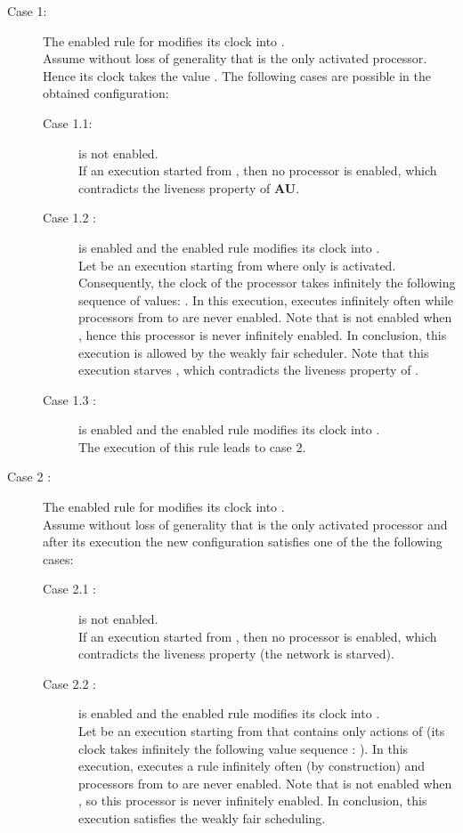 \documentclass[11pt,english,letterpaper]{article}
\newenvironment{proof}{{\noindent\bf Proof. } }{{\hfill }}
\begin{document}
\begin{proof}
\begin{description}
\item[Case 1:] The enabled rule for  modifies its clock into . \\
Assume without loss of generality that  is the only activated processor. Hence its clock takes the value . The following cases are possible in the obtained configuration:

\begin{description}
\item[Case 1.1:]  is not enabled.\\
If an execution started from , then no processor is enabled, which contradicts the liveness property of \textbf{AU}.
\item[Case 1.2 :]  is enabled and the enabled rule modifies its clock into .\\
Let  be an execution starting from  where only  is activated. Consequently, the clock of the processor  takes infinitely the following sequence of values: . In this execution,  executes infinitely often while processors from  to  are never enabled. Note that  is not enabled when , hence this processor is never infinitely enabled. In conclusion, this execution is allowed by the weakly fair scheduler. Note that this execution starves , which contradicts the liveness property of . 
\item[Case 1.3 :]  is enabled and the enabled rule modifies its clock into .\\
The execution of this rule leads to case 2.
\end{description}

\item[Case 2 :] The enabled rule for  modifies its clock into . \\
Assume without loss of generality that  is the only activated processor and after its execution the new configuration satisfies one of the the following cases:

\begin{description}
\item[Case 2.1 :]  is not enabled.\\
If an execution started from , then no processor is enabled, which contradicts the liveness property (the network is starved).
\item[Case 2.2 :]  is enabled and the enabled rule modifies its clock into .\\
Let  be an execution starting from  that contains only actions of  (its clock takes infinitely the following value sequence : ). In this execution,  executes a rule infinitely often (by construction) and processors from  to  are never enabled. Note that  is not enabled when , so this processor is never infinitely enabled. In conclusion, this execution satisfies the weakly fair scheduling. 


\end{description}
\end{description}
\end{proof}
\end{document}
